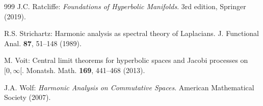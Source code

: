 \documentclass[11pt,a4paper]{article}
\theoremstyle{plain}
\theoremstyle{definition}
\theoremstyle{remark}
\begin{document}
\begin{thebibliography}{999}
        J.C. Ratcliffe: \textit{Foundations of Hyperbolic Manifolds}. 3rd edition, Springer (2019).

        R.S. Strichartz: Harmonic analysis as spectral theory of Laplacians. J. Functional Anal. \textbf{87}, 51--148 (1989).

        M. Voit: Central limit theorems for hyperbolic spaces and Jacobi processes on $[0,\infty[$. Monatsh. Math. \textbf{169}, 441--468 (2013).
        
        J.A. Wolf: \textit{Harmonic Analysis on Commutative Spaces}. American Mathematical Society (2007).
		
	\end{thebibliography}


\appendix
\end{document}
